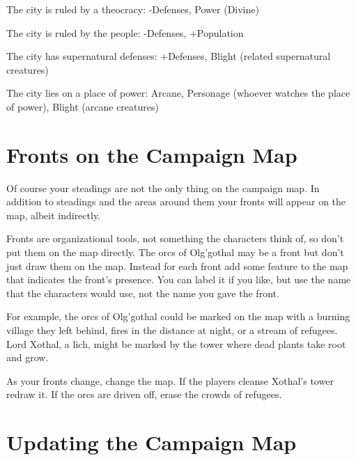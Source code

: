  
\item The city is ruled by a theocracy: -Defenses, Power (Divine)

 
\item The city is ruled by the people: -Defenses, +Population

 
\item The city has supernatural defenses: +Defenses, Blight (related supernatural creatures)

 
\item The city lies on a place of power: Arcane, Personage (whoever watches the place of power), Blight (arcane creatures)


\stopitemize
 
\section{Fronts on the Campaign Map}     
 

Of course your steadings are not the only thing on the campaign map. In addition to steadings and the areas around them your fronts will appear on the map, albeit indirectly.

 

Fronts are organizational tools, not something the characters think of, so don't put them on the map directly. The orcs of Olg'gothal may be a front but don't just draw them on the map. Instead for each front add some feature to the map that indicates the front's presence. You can label it if you like, but use the name that the characters would use, not the name you gave the front.

 

For example, the orcs of Olg'gothal could be marked on the map with a burning village they left behind, fires in the distance at night, or a stream of refugees. Lord Xothal, a lich, might be marked by the tower where dead plants take root and grow.

 

As your fronts change, change the map. If the players cleanse Xothal's tower redraw it. If the orcs are driven off, erase the crowds of refugees.

 
\section{Updating the Campaign Map}    
 

